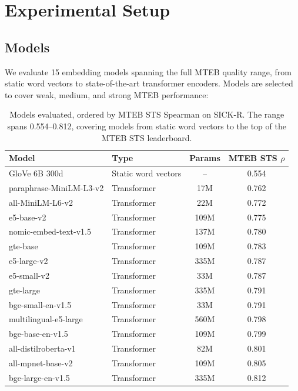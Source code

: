 \documentclass{article}
\begin{document}
\section{Experimental Setup}
\label{sec:experiments}

\subsection{Models}

We evaluate 15 embedding models spanning the full MTEB quality range, from static word vectors to state-of-the-art transformer encoders. Models are selected to cover weak, medium, and strong MTEB performance:

\begin{table}[h]
\centering
\caption{Models evaluated, ordered by MTEB STS Spearman on SICK-R. The range spans 0.554--0.812, covering models from static word vectors to the top of the MTEB STS leaderboard.}
\label{tab:models}
\small
\begin{tabular}{@{}llcc@{}}
\toprule
\textbf{Model} & \textbf{Type} & \textbf{Params} & \textbf{MTEB STS $\rho$} \\
\midrule
GloVe 6B 300d & Static word vectors & -- & 0.554 \\
paraphrase-MiniLM-L3-v2 & Transformer & 17M & 0.762 \\
all-MiniLM-L6-v2 & Transformer & 22M & 0.772 \\
e5-base-v2 & Transformer & 109M & 0.775 \\
nomic-embed-text-v1.5 & Transformer & 137M & 0.780 \\
gte-base & Transformer & 109M & 0.783 \\
e5-large-v2 & Transformer & 335M & 0.787 \\
e5-small-v2 & Transformer & 33M & 0.787 \\
gte-large & Transformer & 335M & 0.791 \\
bge-small-en-v1.5 & Transformer & 33M & 0.791 \\
multilingual-e5-large & Transformer & 560M & 0.798 \\
bge-base-en-v1.5 & Transformer & 109M & 0.799 \\
all-distilroberta-v1 & Transformer & 82M & 0.801 \\
all-mpnet-base-v2 & Transformer & 109M & 0.805 \\
bge-large-en-v1.5 & Transformer & 335M & 0.812 \\
\bottomrule
\end{tabular}
\end{table}
\end{document}
